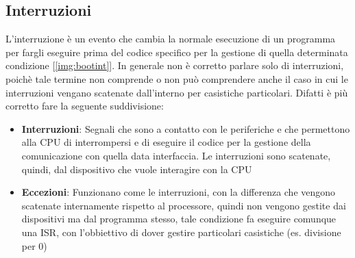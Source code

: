 \subsection{Interruzioni}
L'interruzione è un evento che cambia la normale esecuzione di un programma per fargli eseguire prima del codice specifico per la gestione di quella determinata condizione [\ref{img:bootint}]. In generale non è corretto parlare solo di interruzioni, poichè tale termine non comprende o non può comprendere anche il caso in cui le interruzioni vengano scatenate dall'interno per casistiche particolari. Difatti è più corretto fare la seguente suddivisione:
\begin{itemize}
    \item \textbf{Interruzioni}: Segnali che sono a contatto con le periferiche e che permettono alla CPU di interrompersi e di eseguire il codice per la gestione della comunicazione con quella data interfaccia. Le interruzioni sono scatenate, quindi, dal dispositivo che vuole interagire con la CPU
    \item \textbf{Eccezioni}: Funzionano come le interruzioni, con la differenza che vengono scatenate internamente rispetto al processore, quindi non vengono gestite dai dispositivi ma dal programma stesso, tale condizione fa eseguire comunque una ISR, con l'obbiettivo di dover gestire particolari casistiche (es. divisione per 0)
\end{itemize}


